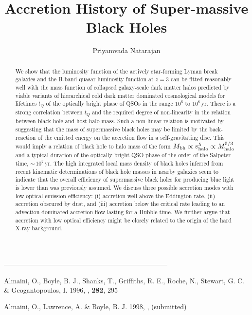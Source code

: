 {{{{{{{{{{{{{{\begin{references}
\end{references}
------------------------------------------------------------------------

\setcounter{page}{297}
\title{Accretion History of Super-massive Black Holes}
\author{Priyamvada Natarajan}

\begin{abstract}
We show that the luminosity function of the actively star-forming
Lyman break galaxies and the B-band quasar luminosity function at $z =
3$ can be fitted reasonably well with the mass function of collapsed
galaxy-scale dark matter halos predicted by viable variants of
hierarchical cold dark matter dominated cosmological models for
lifetimes $t_Q$ of the optically bright phase of QSOs in the range
$10^{6}$ to $10^{8}\,$yr. There is a strong correlation between $t_Q$
and the required degree of non-linearity in the relation between black
hole and host halo mass. Such a non-linear relation is motivated by
suggesting that the mass of supermassive black holes may be limited by
the back-reaction of the emitted energy on the accretion flow in a
self-gravitating disc. This would imply a relation of black hole to
halo mass of the form $M_{\rm bh} \propto v_{\rm halo}^5 \propto
M_{\rm halo}^{5/3}$ and a typical duration of the optically bright QSO
phase of the order of the Salpeter time, $\sim\,10^{7}\,$yr. The high
integrated local mass density of black holes inferred from recent
kinematic determinations of black hole masses in nearby galaxies seem
to indicate that the overall efficiency of supermassive black holes
for producing blue light is lower than was previously assumed. We
discuss three possible accretion modes with low optical emission
efficiency: (i) accretion well above the Eddington rate, (ii)
accretion obscured by dust, and (iii) accretion below the critical
rate leading to an advection dominated accretion flow lasting for a
Hubble time. We further argue that accretion with low optical
efficiency might be closely related to the origin of the hard X-ray
background.
\end{abstract}

\begin{references}

 Almaini, O., Boyle, B. J., Shanks, T., Griffiths, R. E., Roche, N.,
Stewart, G. C. \& Geogantopoulos, I. 1996, \mnras, {\bf 282}, 295

 Almaini, O., Lawrence, A. \& Boyle, B. J. 1998, \mnras, (submitted)


\end{references}}}}}}}}}}}}}}}
